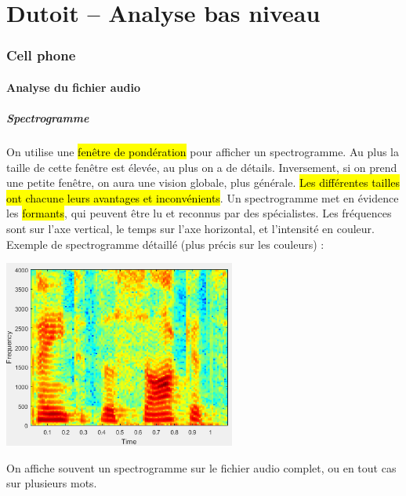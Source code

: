 \documentclass[letterpaper, 12pt]{article}
\newcommand{\alinea}{
\hspace*{0.5cm}}
\begin{document}
%
%
%
%
%
\tableofcontents
%
\newpage
%
%
\part{Dutoit -- Analyse bas niveau}
	\section{Cell phone}
		\subsection{Analyse du fichier audio}
			\subsubsection*{Spectrogramme}
				\alinea On utilise une \hl{fenêtre de pondération} pour afficher un spectrogramme. Au plus la taille de cette fenêtre 
					est élevée, au plus on a de détails. Inversement, si on prend une petite fenêtre, on aura une vision globale, plus 
					générale. \hl{Les différentes tailles ont chacune leurs avantages et inconvénients}. Un spectrogramme met en évidence
					les \hl{formants}, qui peuvent être lu et reconnus par des spécialistes. Les fréquences sont sur l'axe vertical,
					le temps sur l'axe horizontal, et l'intensité en couleur. Exemple de spectrogramme détaillé (plus précis sur les
					couleurs) :
				\begin{center}
					\includegraphics[width=3in]{Images/spectrogram}
				\end{center}
				On affiche souvent un spectrogramme sur le fichier audio complet, ou en tout cas sur plusieurs mots.
\end{document}
